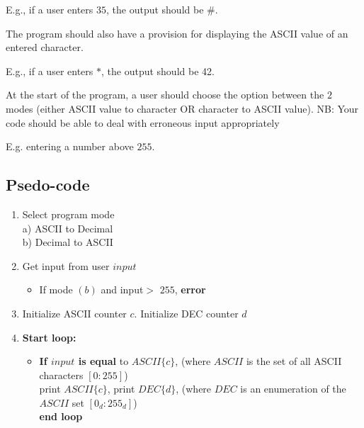 \documentclass[]{article}
\begin{document}
\centering
E.g., if a user enters $35$, the output should be $\#$.

\justify
The program should also have a provision
for displaying the ASCII value of an entered character.

\centering
E.g., if a user enters $*$, the output
should be 42.

\justify
At the start of the program, a user should choose the option between the $2$
modes (either ASCII value to character OR character to ASCII value).
NB: Your code should be able to deal with erroneous input appropriately

\centering
E.g. entering a number above $255$.

\justify

\subsection{Psedo-code}

\begin{enumerate}
	\item Select program mode \\
	\hspace*{3em} a) ASCII to Decimal \\
	\hspace*{3em} b) Decimal to ASCII \\
	\item Get input from user $input$
	\begin{itemize}
		\item If mode $(b)$ and input$ >$ $255$, \textbf{error}
	\end{itemize}
	
	\item Initialize ASCII counter $c$. Initialize DEC counter $d$
	
	\item \textbf{Start loop:}
	\begin{itemize}
	\item \textbf{If $input$ is equal} to $ASCII\{c\}$, (where $ASCII$ is the set of all ASCII characters $[0: 255]$) \\
	\hspace*{6em} print $ASCII\{c\}$, print $DEC\{d\}$, (where $DEC$ is an \hspace*{6em} enumeration of the $ASCII$ set $[0_d: 255_d]$) \\
	\textbf{end loop}
	
	\end{itemize}

\end{enumerate}
\end{document}
